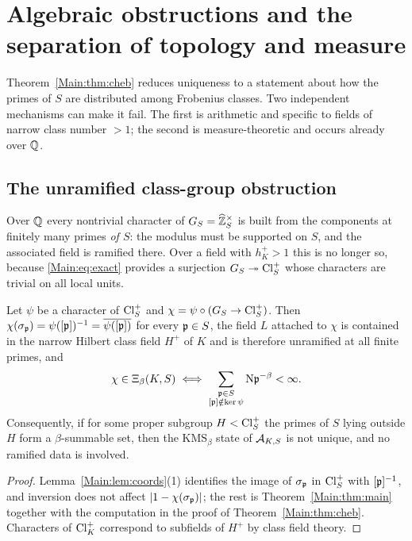 \section{Algebraic obstructions and the separation of topology and measure}\label{Main:sec:obstructions}

Theorem~\ref{Main:thm:cheb} reduces uniqueness to a statement about how the primes
of $S$ are distributed among Frobenius classes. Two independent mechanisms can
make it fail. The first is arithmetic and specific to fields of narrow class
number $>1$; the second is measure-theoretic and occurs already over $\mathbb{Q}$.

\subsection{The unramified class-group obstruction}\label{Main:sec:classgp}

Over $\mathbb{Q}$ every nontrivial character of $G_S=\widehat{\mathbb{Z}}_S^\times$ is built from the
components at finitely many primes \emph{of $S$}: the modulus must be supported
on $S$, and the associated field is ramified there. Over a field with
$h^+_K>1$ this is no longer so, because \eqref{Main:eq:exact} provides a surjection
$G_S\twoheadrightarrow\operatorname{Cl}^+_S$ whose characters are trivial on all local units.

\begin{proposition}\label{Main:prop:unram}
Let $\psi$ be a character of $\operatorname{Cl}^+_S$ and $\chi=\psi\circ(G_S\to\operatorname{Cl}^+_S)$. Then
$\chi(\sigma_{\mathfrak{p}})=\psi([\mathfrak{p}])^{-1}=\overline{\psi([\mathfrak{p}])}$ for every $\mathfrak{p}\in S$, the field $L$ attached to
$\chi$ is contained in the narrow Hilbert class field $H^+$ of $K$ and is
therefore unramified at all finite primes, and
\[
\chi\in\Xi_\beta(K,S)\iff\sum_{\substack{\pp\in S\\ [\pp]\notin\ker\psi}}\Ns\pp^{-\beta}<\infty .
\]
Consequently, if for some proper subgroup $H<\operatorname{Cl}^+_S$ the primes of $S$ lying
outside $H$ form a $\beta$-summable set, then the $\mathrm{KMS}_\beta$ state of
$\mathcal{A}_{K,S}$ is not unique, and no ramified data is involved.
\end{proposition}

\begin{proof}
Lemma~\ref{Main:lem:coords}(1) identifies the image of $\sigma_{\mathfrak{p}}$ in $\operatorname{Cl}^+_S$ with
$[\mathfrak{p}]^{-1}$, and inversion does not affect $|1-\chi(\sigma_{\mathfrak{p}})|$; the rest is Theorem~\ref{Main:thm:main} together with the
computation in the proof of Theorem~\ref{Main:thm:cheb}. Characters of $\operatorname{Cl}^+_K$
correspond to subfields of $H^+$ by class field theory.
\end{proof}

